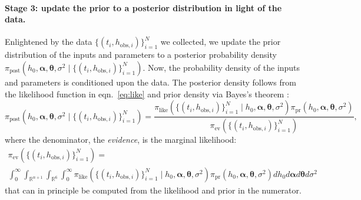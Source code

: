 \documentclass[openacc]{rsproca_new}%
\newcommand\thedata {$\{(t_i,h_{\text{obs}, i})\}_{i=1}^{N}$\xspace}
\newcommand\thedatanomath {\{(t_i,h_{\text{obs}, i})\}_{i=1}^{N}}
\begin{document}
\vspace{-\baselineskip}
\paragraph{Stage 3: update the prior to a posterior distribution in light of the data.}
Enlightened by the data \thedata we collected, we update the prior distribution of the inputs and parameters to a posterior probability density $\pi_{\text{post}}(h_0, \boldsymbol \alpha, \boldsymbol \theta, \sigma^2 \mid \thedatanomath)$. Now, the probability density of the inputs and parameters is conditioned upon the data.
The posterior density follows from the likelihood function in eqn.~\ref{eq:like} and prior density via Bayes's theorem \cite{van2021bayesian,calvetti2018inverse}:
\begin{equation}
	\pi_{\text{post}}(h_0, \boldsymbol \alpha, \boldsymbol \theta, \sigma^2 \mid \thedatanomath) = \frac{
	\pi_{\text{like}}(\thedatanomath \mid h_0,  \boldsymbol \alpha, \boldsymbol \theta, \sigma^2 ) 
	\pi_{\text{pr}}(h_0, \boldsymbol\alpha, \boldsymbol \theta, \sigma^2)
	}{
	\pi_{\text{ev}}(\thedatanomath) 
	}, \label{eq:post}
\end{equation} where the denominator, the \emph{evidence}, is the marginal likelihood:
\begin{multline}
    \pi_{\text{ev}}(\thedatanomath) = \\ 
    \int_0^\infty\int_{\mathbb{R}^{n+1}}  \int_{\mathbb{R}^6}  \int_0^\infty 
    \pi_{\text{like}}(\thedatanomath \mid h_0,  \boldsymbol \alpha, \boldsymbol \theta, \sigma^2 ) 
	\pi_{\text{pr}}(h_0, \boldsymbol\alpha, \boldsymbol \theta, \sigma^2)
	dh_0 d \boldsymbol\alpha d \boldsymbol\theta d\sigma^2 \label{eq:ev}
\end{multline}
that can in principle be computed from the likelihood and prior in the numerator. 
\end{document}
